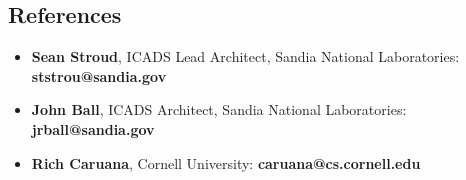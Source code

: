 \documentclass[10pt]{article}
\begin{document}
\subsection*{References}
\begin{itemize}
	\item{\textbf{Sean Stroud}, ICADS Lead Architect, Sandia National Laboratories:  \textbf{ststrou@sandia.gov}}
	\item{\textbf{John Ball}, ICADS Architect, Sandia National Laboratories:  \textbf{jrball@sandia.gov}}
	\item{\textbf{Rich Caruana}, Cornell University:  \textbf{caruana@cs.cornell.edu}}
\end{itemize}
\end{document}
